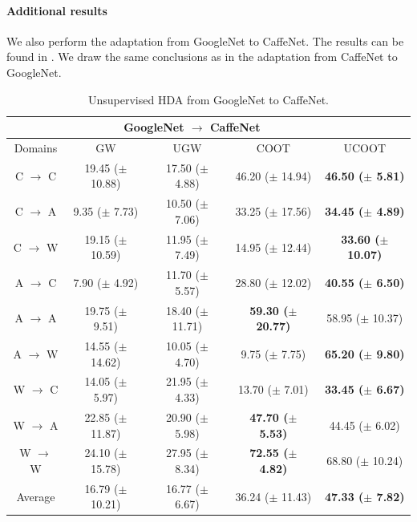 \paragraph{Additional results}
We also perform the adaptation from GoogleNet to CaffeNet. The results can be found in
. We draw the same conclusions as in the adaptation from CaffeNet to GoogleNet.

\hfill
\begin{table}[H]
  \begin{center}
    \begin{small}
      \begin{sc}
        \begin{tabular}{c c c c c}
          \toprule
          & \multicolumn{3}{c}{GoogleNet $\to$ CaffeNet} \\
          \midrule
          Domains & GW & UGW & COOT & UCOOT \\
          \midrule

          C $\to$ C & 19.45 ($\pm$ 10.88) & 17.50 ($\pm$ 4.88) & 46.20 ($\pm$ 14.94) & \textbf{46.50 ($\pm$ 5.81)} \\
          \hline
          C $\to$ A & 9.35 ($\pm$ 7.73) & 10.50 ($\pm$ 7.06) & 33.25 ($\pm$ 17.56) & \textbf{34.45 ($\pm$ 4.89)} \\
          \hline
          C $\to$ W & 19.15 ($\pm$ 10.59) & 11.95 ($\pm$ 7.49) & 14.95 ($\pm$ 12.44) & \textbf{33.60 ($\pm$ 10.07)} \\
          \hline

          A $\to$ C & 7.90 ($\pm$ 4.92) & 11.70 ($\pm$ 5.57) & 28.80 ($\pm$ 12.02) & \textbf{40.55 ($\pm$ 6.50)} \\
          \hline
          A $\to$ A & 19.75 ($\pm$ 9.51) & 18.40 ($\pm$ 11.71) & \textbf{59.30 ($\pm$ 20.77)} & 58.95 ($\pm$ 10.37) \\
          \hline
          A $\to$ W & 14.55 ($\pm$ 14.62) & 10.05 ($\pm$ 4.70) & 9.75 ($\pm$ 7.75) & \textbf{65.20 ($\pm$ 9.80)} \\
          \hline

          W $\to$ C & 14.05 ($\pm$ 5.97) & 21.95 ($\pm$ 4.33) & 13.70 ($\pm$ 7.01) & \textbf{33.45 ($\pm$ 6.67)} \\
          \hline
          W $\to$ A & 22.85 ($\pm$ 11.87) & 20.90 ($\pm$ 5.98) & \textbf{47.70 ($\pm$ 5.53)} & 44.45 ($\pm$ 6.02) \\
          \hline
          W $\to$ W & 24.10 ($\pm$ 15.78) & 27.95 ($\pm$ 8.34) & \textbf{72.55 ($\pm$ 4.82)} & 68.80 ($\pm$ 10.24) \\
          \bottomrule
          Average & 16.79 ($\pm$ 10.21) & 16.77 ($\pm$ 6.67) & 36.24 ($\pm$ 11.43) & \textbf{47.33 ($\pm$ 7.82)} \\
          \bottomrule
        \end{tabular}
      \end{sc}
      \end{small}
  \end{center}
  \caption{Unsupervised HDA from GoogleNet to CaffeNet.}
  \label{tab:table3}
\end{table}

